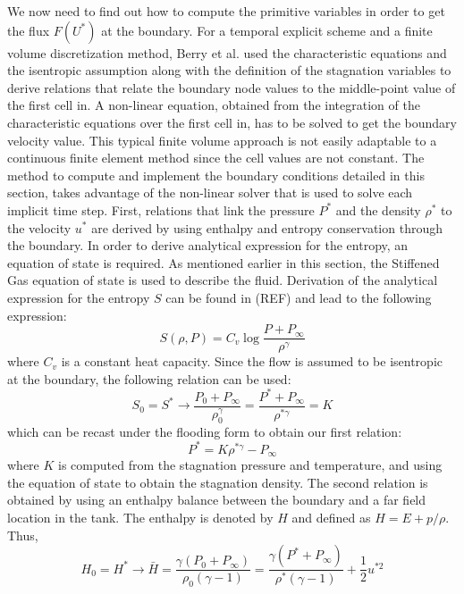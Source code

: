 We now need to find out how to compute the primitive variables in order to get the flux $F(U^*)$ at the boundary. For a temporal explicit scheme and a finite volume discretization method, Berry et al. \cite{SEM} used the characteristic equations and the isentropic assumption along with the definition of the stagnation variables to derive relations that relate the boundary node values to the middle-point value of the first cell in. A non-linear equation, obtained from the integration of the characteristic equations over the first cell in, has to be solved to get the boundary velocity value. This typical finite volume approach is not easily adaptable to a continuous finite element method since the cell values are not constant. The method to compute and implement the boundary conditions detailed in this section, takes advantage of the non-linear solver that is used to solve each implicit time step. First, relations that link the pressure $P^*$ and the density $\rho^*$ to the velocity $u^*$ are derived by using enthalpy and entropy conservation through the boundary. In order to derive analytical expression for the entropy, an equation of state is required. As mentioned earlier in this section, the Stiffened Gas equation of state is used to describe the fluid. Derivation of the analytical expression for the entropy $S$ can be found in (REF) and lead to the following expression:
\begin{equation}\label{eq:entropy_SGEOS}
S(\rho, P) = C_v \log \frac{P+P_{\infty}}{\rho^{\gamma}} \nonumber
\end{equation}
where $C_v$ is a constant heat capacity. Since the flow is assumed to be isentropic at the boundary, the following relation can be used:
\begin{equation}
S_0 = S^* \rightarrow \frac{P_0 + P_{\infty}}{\rho_0^{\gamma}} = \frac{P^*+P_{\infty}}{\rho^{*\gamma}} = K \nonumber
\end{equation} 
which can be recast under the flooding form to obtain our first relation:
\begin{equation}\label{eq:first_relation}
P^* = K \rho^{*\gamma} - P_{\infty}
\end{equation}
where $K$ is computed from the stagnation pressure and temperature, and using the equation of state to obtain the stagnation density.
The second relation is obtained by using an enthalpy balance between the boundary and a far field location in the tank. The enthalpy is denoted by $H$ and defined as $H = E + p/ \rho$. Thus,
\begin{equation}
H_0 = H^* \rightarrow \bar{H} = \frac{\gamma (P_0+P_{\infty})}{\rho_0 (\gamma-1)} =\frac{ \gamma (P^*+P_{\infty})}{\rho^* (\gamma-1)} + \frac{1}{2} u^{*2} \nonumber
\end{equation}
